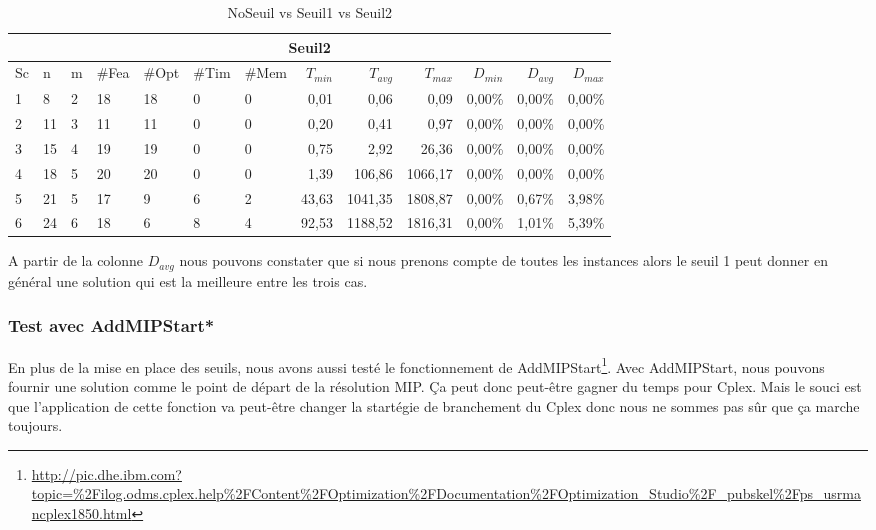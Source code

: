 \begin{table}[h]
\medskip \par
    \begin{tabular}{|l|l|l|l|l|l|l|r|r|r|r|r|r|}
    	\hline
    	\multicolumn{13}{|c|}{Seuil2}\\ \hline
Sc &	n	&m	&\#Fea	&\#Opt	&\#Tim &\#Mem	&$T_{min}$ & $T_{avg}$	& $T_{max}$ & $D_{min}$ & $D_{avg}$	& $D_{max}$ \\ \hline
1&	8 &	2&	18&	18&	0&	0&	0,01&	0,06&	0,09	&0,00\%&	0,00\%&	0,00\%    \\ \hline
2&	11&	3&	11&	11&	0&	0&	0,20&	0,41&	0,97	&0,00\%&	0,00\%&	0,00\%     \\ \hline
3&	15&	4&	19&	19&	0&	0&	0,75&	2,92&	26,36	&0,00\%&	0,00\%&	0,00\%  \\ \hline
4&	18&	5&	20&	20&	0&	0&	1,39	&106,86	&1066,17	&0,00\%&	0,00\%&	0,00\%     \\ \hline
5&	21&	5&	17&	9 &	6&	2&	43,63	&1041,35&	1808,87	&0,00\%&	0,67\%&	3,98\%     \\ \hline
6&	24&	6&	18&	6 &	8&	4&	92,53	&1188,52&	1816,31	&0,00\%&	1,01\%&	5,39\%     \\ \hline
    \end{tabular}
    \caption{NoSeuil vs Seuil1 vs Seuil2}
    \label{tab_cut2_s2_tab2}
\end{table}
\bigskip
A partir de la colonne $D_{avg}$ nous pouvons constater que si nous prenons compte de toutes les instances alors le seuil 1 peut donner en général une solution qui est la meilleure entre les trois cas.

\clearpage
\subsubsection{Test avec AddMIPStart*}
En plus de la mise en place des seuils, nous avons aussi testé le fonctionnement de AddMIPStart\footnote{\url{http://pic.dhe.ibm.com?topic=\%2Filog.odms.cplex.help\%2FContent\%2FOptimization\%2FDocumentation\%2FOptimization_Studio\%2F_pubskel\%2Fps_usrmancplex1850.html}}. Avec AddMIPStart, nous pouvons fournir une solution comme le point de départ de la résolution MIP. Ça peut donc peut-être gagner du temps pour Cplex. Mais le souci est que l'application de cette fonction va peut-être changer la startégie de branchement du Cplex donc nous ne sommes pas sûr que ça marche toujours.


